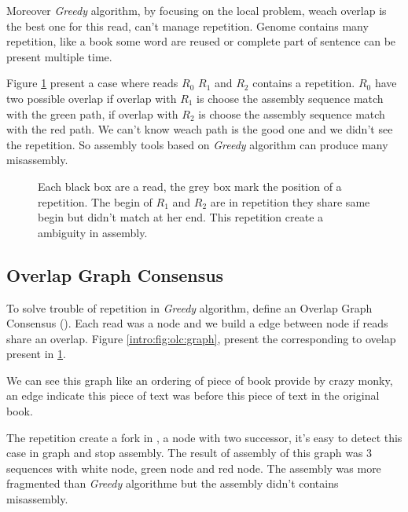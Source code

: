 \documentclass[./main.tex]{subfiles}
\begin{document}
Moreover \textit{Greedy} algorithm, by focusing on the local problem, weach overlap is the best one for this read, can't manage repetition. Genome contains many repetition, like a book some word are reused or complete part of sentence can be present multiple time.

Figure \ref{intro:fig:greedy:repetition} present a case where reads $R_0$ $R_1$ and $R_2$ contains a repetition. $R_0$ have two possible overlap if overlap with $R_1$ is choose the assembly sequence match with the green path, if overlap with $R_2$ is choose the assembly sequence match with the red path. We can't know weach path is the good one and we didn't see the repetition. So assembly tools based on \textit{Greedy} algorithm can produce many misassembly. 

\begin{figure}[ht]
    \centering 
    
    \caption{Each black box are a read, the grey box mark the position of a repetition. The begin of $R_1$ and $R_2$ are in repetition they share same begin but didn't match at her end. This repetition create a ambiguity in assembly.}
    \label{intro:fig:greedy:repetition}
\end{figure}

\subsection{Overlap Graph Consensus}

To solve trouble of repetition in \textit{Greedy} algorithm,  define an Overlap Graph Consensus (\OLC). Each read was a node and we build a edge between node if reads share an overlap. Figure \ref{intro:fig:olc:graph}, present the \OLC corresponding to ovelap present in \ref{intro:fig:greedy:repetition}.

We can see this graph like an ordering of piece of book provide by crazy monky, an edge indicate this piece of text was before this piece of text in the original book.

The repetition create a fork in \OLC, a node with two successor, it's easy to detect this case in graph and stop assembly. The result of assembly of this graph was 3 sequences with white node, green node and red node. The assembly was more fragmented than \textit{Greedy} algorithme but the assembly didn't contains misassembly.
\end{document}
